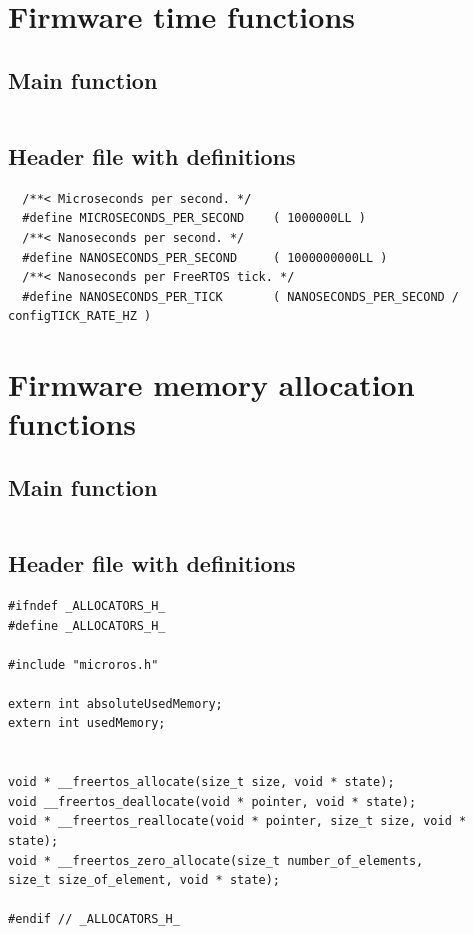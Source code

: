 \documentclass[10pt]{article}
\begin{document}
\pagebreak
\section{Firmware time functions}
\label{sec:timefunctions}

\subsection{Main function}
\inputminted[linenos]{c}{./src/clock.c}

\subsection{Header file with definitions}
\begin{verbatim}
  /**< Microseconds per second. */
  #define MICROSECONDS_PER_SECOND    ( 1000000LL )  
  /**< Nanoseconds per second. */
  #define NANOSECONDS_PER_SECOND     ( 1000000000LL ) 
  /**< Nanoseconds per FreeRTOS tick. */  
  #define NANOSECONDS_PER_TICK       ( NANOSECONDS_PER_SECOND / configTICK_RATE_HZ ) 
\end{verbatim}


\pagebreak
\section{Firmware memory allocation functions}
\label{sec:allocfunctions}

\subsection{Main function}
\inputminted[linenos]{c}{./src/allocators.c}

\subsection{Header file with definitions}
\begin{verbatim}
#ifndef _ALLOCATORS_H_
#define _ALLOCATORS_H_

#include "microros.h"

extern int absoluteUsedMemory;
extern int usedMemory;


void * __freertos_allocate(size_t size, void * state);
void __freertos_deallocate(void * pointer, void * state);
void * __freertos_reallocate(void * pointer, size_t size, void * state);
void * __freertos_zero_allocate(size_t number_of_elements,
size_t size_of_element, void * state);

#endif // _ALLOCATORS_H_
\end{verbatim}
\end{document}

